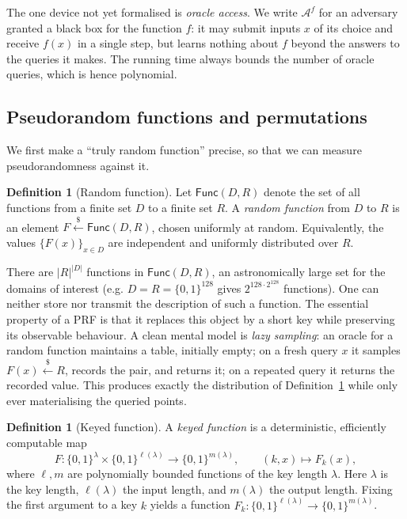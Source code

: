 \documentclass[11pt,a4paper]{article}
\theoremstyle{definition}
\newtheorem{definition}[theorem]{Definition}
\theoremstyle{remark}
\begin{document}
The one device not yet formalised is \emph{oracle access}. We write \(\mathcal{A}^{f}\) for an adversary granted a black box for the function \(f\): it may submit inputs \(x\) of its choice and receive \(f(x)\) in a single step, but learns nothing about \(f\) beyond the answers to the queries it makes. The running time always bounds the number of oracle queries, which is hence polynomial.

\subsection{Pseudorandom functions and permutations}\label{prf:ssec:prf}

We first make a ``truly random function'' precise, so that we can measure pseudorandomness against it.

\begin{definition}[Random function]\label{prf:def:randfun}
Let \(\mathsf{Func}(D, R)\) denote the set of all functions from a finite set \(D\) to a finite set \(R\). A \emph{random function} from \(D\) to \(R\) is an element \(F \xleftarrow{\$} \mathsf{Func}(D,R)\), chosen uniformly at random. Equivalently, the values \(\{F(x)\}_{x \in D}\) are independent and uniformly distributed over \(R\).
\end{definition}

There are \(|R|^{|D|}\) functions in \(\mathsf{Func}(D,R)\), an astronomically large set for the domains of interest (e.g. \(D = R = \{0,1\}^{128}\) gives \(2^{128 \cdot 2^{128}}\) functions). One can neither store nor transmit the description of such a function. The essential property of a PRF is that it replaces this object by a short key while preserving its observable behaviour. A clean mental model is \emph{lazy sampling}: an oracle for a random function maintains a table, initially empty; on a fresh query \(x\) it samples \(F(x) \xleftarrow{\$} R\), records the pair, and returns it; on a repeated query it returns the recorded value. This produces exactly the distribution of Definition~\ref{prf:def:randfun} while only ever materialising the queried points.

\begin{definition}[Keyed function]\label{prf:def:keyed}
A \emph{keyed function} is a deterministic, efficiently computable map
\[
  F \colon \{0,1\}^{\lambda} \times \{0,1\}^{\ell(\lambda)} \longrightarrow \{0,1\}^{m(\lambda)},
  \qquad (k, x) \longmapsto F_k(x),
\]
where \(\ell, m\) are polynomially bounded functions of the key length \(\lambda\). Here \(\lambda\) is the key length, \(\ell(\lambda)\) the input length, and \(m(\lambda)\) the output length. Fixing the first argument to a key \(k\) yields a function \(F_k \colon \{0,1\}^{\ell(\lambda)} \to \{0,1\}^{m(\lambda)}\).
\end{definition}
\end{document}
